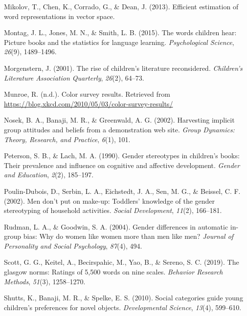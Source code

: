 \documentclass[english,,man,floatsintext]{apa6}
\begin{document}
\leavevmode\hypertarget{ref-mikolov2013efficient}{}%
Mikolov, T., Chen, K., Corrado, G., \& Dean, J. (2013). Efficient estimation of word representations in vector space.

\leavevmode\hypertarget{ref-montag2015words}{}%
Montag, J. L., Jones, M. N., \& Smith, L. B. (2015). The words children hear: Picture books and the statistics for language learning. \emph{Psychological Science}, \emph{26}(9), 1489--1496.

\leavevmode\hypertarget{ref-morgenstern2001rise}{}%
Morgenstern, J. (2001). The rise of children's literature reconsidered. \emph{Children's Literature Association Quarterly}, \emph{26}(2), 64--73.

\leavevmode\hypertarget{ref-xkcd}{}%
Munroe, R. (n.d.). Color survey results. Retrieved from \url{https://blog.xkcd.com/2010/05/03/color-survey-results/}

\leavevmode\hypertarget{ref-nosek2002harvesting}{}%
Nosek, B. A., Banaji, M. R., \& Greenwald, A. G. (2002). Harvesting implicit group attitudes and beliefs from a demonstration web site. \emph{Group Dynamics: Theory, Research, and Practice}, \emph{6}(1), 101.

\leavevmode\hypertarget{ref-peterson1990gender}{}%
Peterson, S. B., \& Lach, M. A. (1990). Gender stereotypes in children's books: Their prevalence and influence on cognitive and affective development. \emph{Gender and Education}, \emph{2}(2), 185--197.

\leavevmode\hypertarget{ref-poulin2002men}{}%
Poulin-Dubois, D., Serbin, L. A., Eichstedt, J. A., Sen, M. G., \& Beissel, C. F. (2002). Men don't put on make-up: Toddlers' knowledge of the gender stereotyping of household activities. \emph{Social Development}, \emph{11}(2), 166--181.

\leavevmode\hypertarget{ref-rudman2004gender}{}%
Rudman, L. A., \& Goodwin, S. A. (2004). Gender differences in automatic in-group bias: Why do women like women more than men like men? \emph{Journal of Personality and Social Psychology}, \emph{87}(4), 494.

\leavevmode\hypertarget{ref-scott2019glasgow}{}%
Scott, G. G., Keitel, A., Becirspahic, M., Yao, B., \& Sereno, S. C. (2019). The glasgow norms: Ratings of 5,500 words on nine scales. \emph{Behavior Research Methods}, \emph{51}(3), 1258--1270.

\leavevmode\hypertarget{ref-shutts2010social}{}%
Shutts, K., Banaji, M. R., \& Spelke, E. S. (2010). Social categories guide young children's preferences for novel objects. \emph{Developmental Science}, \emph{13}(4), 599--610.
\end{document}
